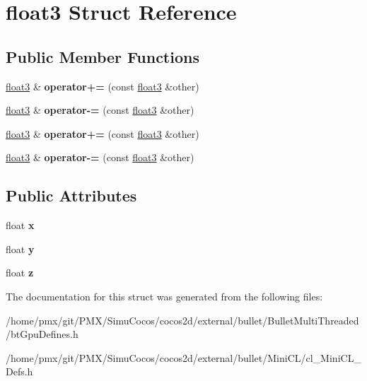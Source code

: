\hypertarget{structfloat3}{}\section{float3 Struct Reference}
\label{structfloat3}
\subsection*{Public Member Functions}
\begin{DoxyCompactItemize}
\item 
\mbox{\label{structfloat3_a8dc80b5be79f44078b5c409ca224d9e4}} 
\hyperlink{structfloat3}{float3} \& {\bfseries operator+=} (const \hyperlink{structfloat3}{float3} \&other)
\item 
\mbox{\label{structfloat3_aa0028ed20b1e7e64307ddaf999ada1a8}} 
\hyperlink{structfloat3}{float3} \& {\bfseries operator-\/=} (const \hyperlink{structfloat3}{float3} \&other)
\item 
\mbox{\label{structfloat3_a8dc80b5be79f44078b5c409ca224d9e4}} 
\hyperlink{structfloat3}{float3} \& {\bfseries operator+=} (const \hyperlink{structfloat3}{float3} \&other)
\item 
\mbox{\label{structfloat3_aa0028ed20b1e7e64307ddaf999ada1a8}} 
\hyperlink{structfloat3}{float3} \& {\bfseries operator-\/=} (const \hyperlink{structfloat3}{float3} \&other)
\end{DoxyCompactItemize}
\subsection*{Public Attributes}
\begin{DoxyCompactItemize}
\item 
\mbox{\label{structfloat3_af621f02abb1c788738fe61ea9807ff9c}} 
float {\bfseries x}
\item 
\mbox{\label{structfloat3_aa6147d421a81889971f8c66aa92abf0d}} 
float {\bfseries y}
\item 
\mbox{\label{structfloat3_a772dffd42d89f350c5a1b766c4703245}} 
float {\bfseries z}
\end{DoxyCompactItemize}


The documentation for this struct was generated from the following files\+:\begin{DoxyCompactItemize}
\item 
/home/pmx/git/\+P\+M\+X/\+Simu\+Cocos/cocos2d/external/bullet/\+Bullet\+Multi\+Threaded/bt\+Gpu\+Defines.\+h\item 
/home/pmx/git/\+P\+M\+X/\+Simu\+Cocos/cocos2d/external/bullet/\+Mini\+C\+L/cl\+\_\+\+Mini\+C\+L\+\_\+\+Defs.\+h\end{DoxyCompactItemize}
